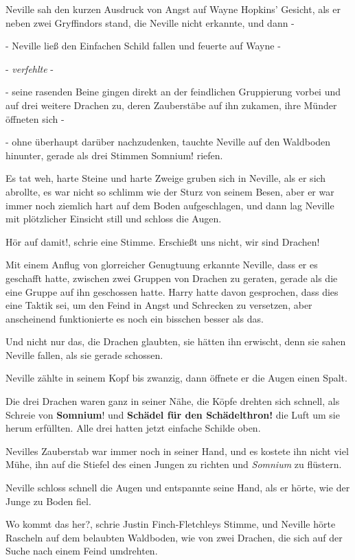 Neville sah den kurzen Ausdruck von Angst auf Wayne Hopkins' Gesicht, als er
neben zwei Gryffindors stand, die Neville nicht erkannte, und dann -

- Neville ließ den Einfachen Schild fallen und feuerte auf Wayne -

- \emph{verfehlte} -

- seine rasenden Beine gingen direkt an der feindlichen Gruppierung vorbei und
auf drei weitere Drachen zu, deren Zauberstäbe auf ihn zukamen, ihre Münder
öffneten sich -

- ohne überhaupt darüber nachzudenken, tauchte Neville auf den Waldboden
hinunter, gerade als drei Stimmen \glqq{} Somnium!\grqq{} riefen.

Es tat weh, harte Steine und harte Zweige gruben sich in Neville, als er sich
abrollte, es war nicht so schlimm wie der Sturz von seinem Besen, aber er war
immer noch ziemlich hart auf dem Boden aufgeschlagen, und dann lag Neville mit
plötzlicher Einsicht still und schloss die Augen.

\glqq{}Hör auf damit!\grqq{}, schrie eine Stimme. \glqq{}Erschießt uns nicht,
wir sind Drachen!\grqq{}

Mit einem Anflug von glorreicher Genugtuung erkannte Neville, dass er es
geschafft hatte, zwischen zwei Gruppen von Drachen zu geraten, gerade als die
eine Gruppe auf ihn geschossen hatte. Harry hatte davon gesprochen, dass dies
eine Taktik sei, um den Feind in Angst und Schrecken zu versetzen, aber
anscheinend funktionierte es noch ein bisschen besser als das.

Und nicht nur das, die Drachen glaubten, sie hätten ihn erwischt, denn sie sahen
Neville fallen, als sie gerade schossen.

Neville zählte in seinem Kopf bis zwanzig, dann öffnete er die Augen einen
Spalt.

Die drei Drachen waren ganz in seiner Nähe, die Köpfe drehten sich schnell, als
Schreie von \glqq{}\textbf{Somnium}!\grqq{} und \glqq{}\textbf{Schädel für den
Schädelthron!}\grqq{} die Luft um sie herum erfüllten. Alle drei hatten jetzt
einfache Schilde oben.

Nevilles Zauberstab war immer noch in seiner Hand, und es kostete ihn nicht viel
Mühe, ihn auf die Stiefel des einen Jungen zu richten und
\glqq{}\emph{Somnium}\grqq{} zu flüstern.

Neville schloss schnell die Augen und entspannte seine Hand, als er hörte, wie
der Junge zu Boden fiel.

\glqq{}Wo kommt das her?\grqq{}, schrie Justin Finch-Fletchleys Stimme, und
Neville hörte Rascheln auf dem belaubten Waldboden, wie von zwei Drachen, die
sich auf der Suche nach einem Feind umdrehten.

